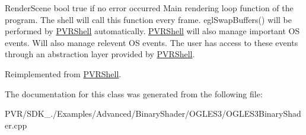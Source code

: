   Render\+Scene  bool true if no error occurred  Main rendering loop function of the program. The shell will call this function every frame. egl\+Swap\+Buffers() will be performed by \hyperlink{class_p_v_r_shell}{P\+V\+R\+Shell} automatically. \hyperlink{class_p_v_r_shell}{P\+V\+R\+Shell} will also manage important O\+S events. Will also manage relevent O\+S events. The user has access to these events through an abstraction layer provided by \hyperlink{class_p_v_r_shell}{P\+V\+R\+Shell}. 

Reimplemented from \hyperlink{class_p_v_r_shell_ae0eb5f797cbe993a22b8659f9c332578}{P\+V\+R\+Shell}.



The documentation for this class was generated from the following file\+:\begin{DoxyCompactItemize}
\item 
P\+V\+R/\+S\+D\+K\+\_./\+Examples/\+Advanced/\+Binary\+Shader/\+O\+G\+L\+E\+S3/O\+G\+L\+E\+S3\+Binary\+Shader.\+cpp\end{DoxyCompactItemize}
